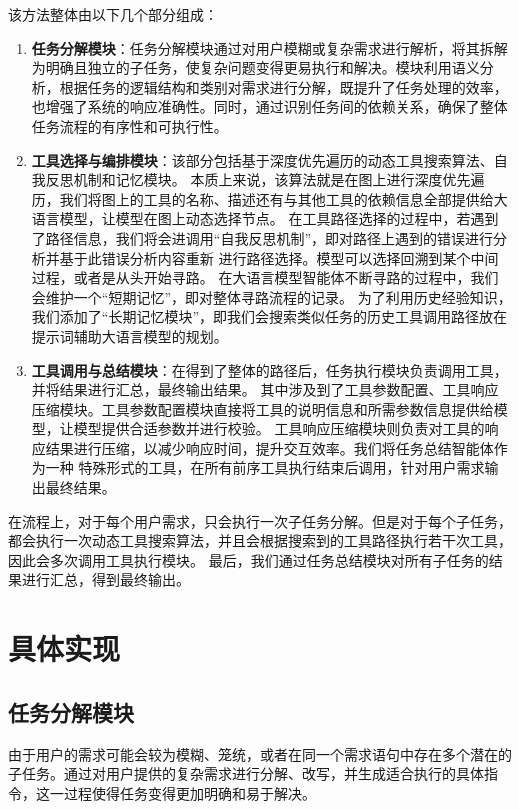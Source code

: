 该方法整体由以下几个部分组成：

\begin{enumerate}
  \item \textbf{任务分解模块}：任务分解模块通过对用户模糊或复杂需求进行解析，将其拆解为明确且独立的子任务，使复杂问题变得更易执行和解决。模块利用语义分析，根据任务的逻辑结构和类别对需求进行分解，既提升了任务处理的效率，也增强了系统的响应准确性。同时，通过识别任务间的依赖关系，确保了整体任务流程的有序性和可执行性。
  \item \textbf{工具选择与编排模块}：该部分包括基于深度优先遍历的动态工具搜索算法、自我反思机制和记忆模块。
  本质上来说，该算法就是在图上进行深度优先遍历，我们将图上的工具的名称、描述还有与其他工具的依赖信息全部提供给大语言模型，让模型在图上动态选择节点。
  在工具路径选择的过程中，若遇到了路径信息，我们将会进调用“自我反思机制”，即对路径上遇到的错误进行分析并基于此错误分析内容重新
  进行路径选择。模型可以选择回溯到某个中间过程，或者是从头开始寻路。
  在大语言模型智能体不断寻路的过程中，我们会维护一个“短期记忆”，即对整体寻路流程的记录。
  为了利用历史经验知识，我们添加了“长期记忆模块”，即我们会搜索类似任务的历史工具调用路径放在提示词辅助大语言模型的规划。
  \item \textbf{工具调用与总结模块}：在得到了整体的路径后，任务执行模块负责调用工具，并将结果进行汇总，最终输出结果。
  其中涉及到了工具参数配置、工具响应压缩模块。工具参数配置模块直接将工具的说明信息和所需参数信息提供给模型，让模型提供合适参数并进行校验。
  工具响应压缩模块则负责对工具的响应结果进行压缩，以减少响应时间，提升交互效率。我们将任务总结智能体作为一种
  特殊形式的工具，在所有前序工具执行结束后调用，针对用户需求输出最终结果。
\end{enumerate}

在流程上，对于每个用户需求，只会执行一次子任务分解。但是对于每个子任务，都会执行一次动态工具搜索算法，并且会根据搜索到的工具路径执行若干次工具，因此会多次调用工具执行模块。
最后，我们通过任务总结模块对所有子任务的结果进行汇总，得到最终输出。

\section{具体实现}

\subsection{任务分解模块}

由于用户的需求可能会较为模糊、笼统，或者在同一个需求语句中存在多个潜在的子任务。通过对用户提供的复杂需求进行分解、改写，并生成适合执行的具体指令，这一过程使得任务变得更加明确和易于解决。

